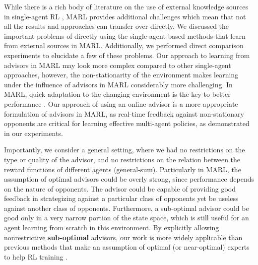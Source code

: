 \documentclass[jair, twoside,11pt,theapa]{article}
\begin{document}
While there is a rich body of literature on the use of external knowledge sources in single-agent RL \citep{bignold21}, MARL provides additional challenges which mean that not all the results and approaches can transfer over directly. We discussed the important problems of directly using the single-agent based methods that learn from external sources in MARL. Additionally, we performed direct comparison experiments to elucidate a few of these problems.  Our approach to learning from advisors in MARL may look more complex compared to other single-agent approaches, however, the non-stationarity of the environment makes learning under the influence of advisors in MARL considerably more challenging. In MARL, quick adaptation to the changing environment is the key to better performance \citep{littman2001friend}. Our approach of using an online advisor is a more appropriate formulation of advisors in MARL, as real-time feedback against non-stationary opponents are critical for learning effective multi-agent policies, as demonstrated in our experiments.


Importantly, we consider a general setting, where we had no restrictions on the type or quality of the advisor, and no restrictions on the relation between the reward functions of different agents (general-sum). Particularly in MARL, the assumption of optimal advisors could be overly strong, since performance depends on the nature of opponents. The advisor could be capable of providing good feedback in strategizing against a particular class of opponents yet be useless against another class of opponents. Furthermore, a sub-optimal advisor could be good only in a very narrow portion of the state space, which is still useful for an agent learning from scratch in this environment. By explicitly allowing nonrestrictive \textbf{sub-optimal} advisors, our work is more widely applicable than previous methods that make an assumption of optimal (or near-optimal) experts to help RL training \citep{ross2011reduction, giusti2015machine, sonabend2020}.  
\end{document}
